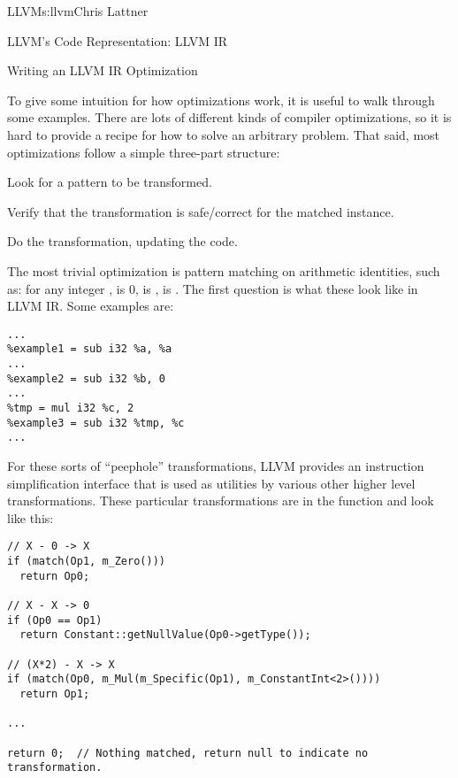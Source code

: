 \begin{aosachapter}{LLVM}{s:llvm}{Chris Lattner}
\begin{aosasect1}{LLVM's Code Representation: LLVM IR}
\begin{aosasect2}{Writing an LLVM IR Optimization}

To give some intuition for how optimizations work, it is useful to
walk through some examples.  There are lots of different kinds of
compiler optimizations, so it is hard to provide a recipe for how to
solve an arbitrary problem.  That said, most optimizations follow a
simple three-part structure:

\begin{aosaitemize}

  \item Look for a pattern to be transformed.

  \item Verify that the transformation is safe/correct for the matched
  instance.

  \item Do the transformation, updating the code.

\end{aosaitemize}

The most trivial optimization is pattern matching on arithmetic
identities, such as: for any integer ,  is 0,
 is ,  is .  The first
question is what these look like in LLVM IR\@.  Some examples are:

\begin{verbatim}
...
%example1 = sub i32 %a, %a
...
%example2 = sub i32 %b, 0
...
%tmp = mul i32 %c, 2
%example3 = sub i32 %tmp, %c
...
\end{verbatim}

For these sorts of ``peephole'' transformations, LLVM provides an
instruction simplification interface that is used as utilities by
various other higher level transformations.  These particular
transformations are in the  function and look
like this:

\begin{verbatim}
// X - 0 -> X
if (match(Op1, m_Zero()))
  return Op0;

// X - X -> 0
if (Op0 == Op1)
  return Constant::getNullValue(Op0->getType());

// (X*2) - X -> X
if (match(Op0, m_Mul(m_Specific(Op1), m_ConstantInt<2>())))
  return Op1;

...

return 0;  // Nothing matched, return null to indicate no transformation.
\end{verbatim}


\end{aosasect2}
\end{aosasect1}
\end{aosachapter}
